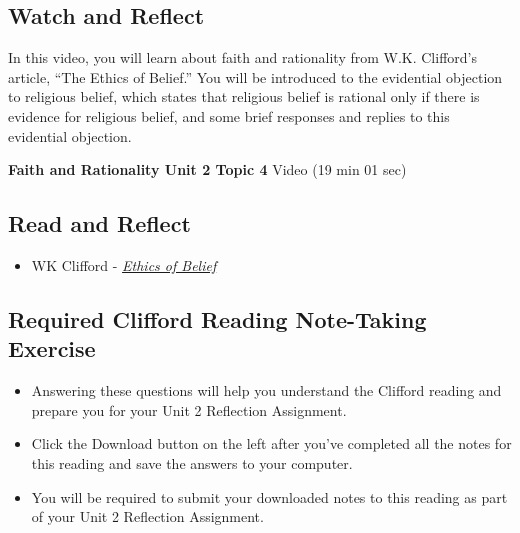 \documentclass[
]{book}
\providecommand{\tightlist}{%
  \setlength{\itemsep}{0pt}\setlength{\parskip}{0pt}}
\begin{document}
\hypertarget{watch-and-reflect-12}{%
\subsection*{Watch and Reflect}\label{watch-and-reflect-12}}

In this video, you will learn about faith and rationality from W.K. Clifford's article, ``The Ethics of Belief.'' You will be introduced to the evidential objection to religious belief, which states that religious belief is rational only if there is evidence for religious belief, and some brief responses and replies to this evidential objection.

\textbf{Faith and Rationality Unit 2 Topic 4} Video (19 min 01 sec)

\hypertarget{read-and-reflect-6}{%
\subsection*{Read and Reflect}\label{read-and-reflect-6}}

\begin{itemize}
\tightlist
\item
  WK Clifford - \href{assets/u2/PHIL-100-Clifford-Ethics-of-Belief.pdf}{\emph{Ethics of Belief}}
\end{itemize}

\hypertarget{required-clifford-reading-note-taking-exercise}{%
\subsection*{Required Clifford Reading Note-Taking Exercise}\label{required-clifford-reading-note-taking-exercise}}

\begin{reflect}
\begin{itemize}
\tightlist
\item
  Answering these questions will help you understand the Clifford reading and prepare you for your Unit 2 Reflection Assignment.\\
\item
  Click the Download button on the left after you've completed all the notes for this reading and save the answers to your computer.\\
\item
  You will be required to submit your downloaded notes to this reading as part of your Unit 2 Reflection Assignment.
\end{itemize}
\end{reflect}
\end{document}
